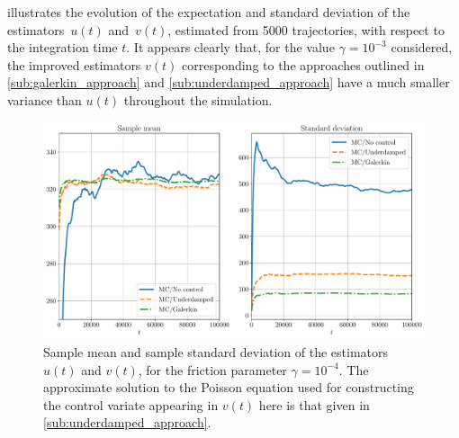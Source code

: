 \documentclass[11pt,a4paper]{article}
\theoremstyle{plain}
\numberwithin{equation}{section}
\begin{document}
 illustrates the evolution of the expectation and standard deviation of the estimators~$u(t)$ and~$v(t)$,
estimated from 5000 trajectories,
with respect to the integration time $t$.
It appears clearly that,
for the value $\gamma = 10^{-3}$ considered,
the improved estimators $v(t)$ corresponding to the approaches outlined in \cref{sub:galerkin_approach} and \cref{sub:underdamped_approach}
have a much smaller variance than $u(t)$ throughout the simulation.
\begin{figure}[ht]
    \centering
    \includegraphics[width=0.99\linewidth]{figures/time.pdf}
    \caption{
        Sample mean and sample standard deviation of the estimators $u(t)$ and $v(t)$,
        for the friction parameter $\gamma = 10^{-4}$.
        The approximate solution to the Poisson equation used for constructing the control variate appearing in $v(t)$ here
        is that given in \cref{sub:underdamped_approach}.
    }%
    \label{fig:time_bias_variance}
\end{figure}
\end{document}
